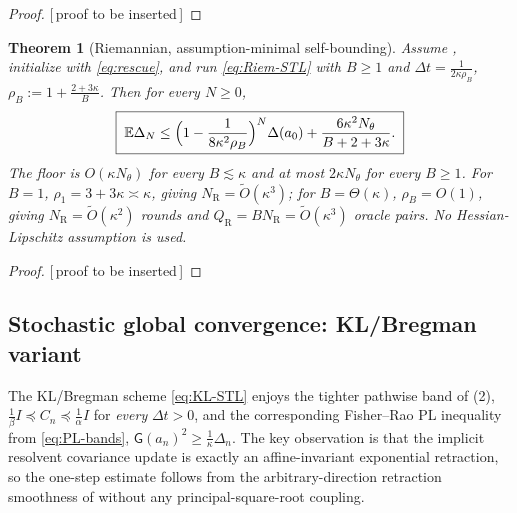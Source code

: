 \documentclass[11pt]{article}
\theoremstyle{plain}
\newtheorem{theorem}{Theorem}[section]
\theoremstyle{definition}
\theoremstyle{remark}
\newcommand{\E}{\mathbb{E}}
\newcommand{\Id}{I}
\newcommand{\Riem}{\mathrm{R}}
\newcommand{\Gradnorm}{\mathsf{G}}
\newcommand{\PROOFHOLE}{{\color{red}\textsf{[\,proof to be inserted\,]}}}
\begin{document}
\begin{proof}
\PROOFHOLE
\end{proof}

\begin{theorem}[Riemannian, assumption-minimal self-bounding]
\label{thm:Riem-selfbound}
Assume , initialize with \eqref{eq:rescue}, and run \eqref{eq:Riem-STL}
with $B\geq1$ and $\Delta t=\tfrac1{2\kappa\rho_B}$, $\rho_B:=1+\tfrac{2+3\kappa}B$. Then for every
$N\geq0$,
\begin{equation}
\label{eq:Riem-selfbound}
    \boxed{\;
    \E\Delta_N\leq\Bigl(1-\frac1{8\kappa^2\rho_B}\Bigr)^N\Delta(a_0)+\frac{6\kappa^2N_\theta}{B+2+3\kappa} .
    \;}
\end{equation}
The floor is $O(\kappa N_\theta)$ for every $B\lesssim\kappa$ and at most $2\kappa N_\theta$ for every
$B\geq1$. For $B=1$, $\rho_1=3+3\kappa\asymp\kappa$, giving $N_{\Riem}=\widetilde O(\kappa^3)$; for
$B=\Theta(\kappa)$, $\rho_B=O(1)$, giving $N_{\Riem}=\widetilde O(\kappa^2)$ rounds and
$Q_{\Riem}=BN_{\Riem}=\widetilde O(\kappa^3)$ oracle pairs. No Hessian-Lipschitz assumption is used.
\end{theorem}

\begin{proof}
\PROOFHOLE
\end{proof}
\subsection{Stochastic global convergence: KL/Bregman variant}
\label{sec:stoch-KL}

The KL/Bregman scheme \eqref{eq:KL-STL} enjoys the tighter pathwise band of
(2), $\tfrac1\beta\Id\preceq C_n\preceq\tfrac1\alpha\Id$ for \emph{every}
$\Delta t>0$, and the corresponding Fisher--Rao PL inequality from \eqref{eq:PL-bands},
$\Gradnorm(a_n)^2\geq\tfrac1\kappa\Delta_n$. The key observation is that the implicit resolvent
covariance update is exactly an affine-invariant exponential retraction, so the one-step estimate
follows from the arbitrary-direction retraction smoothness of  without any
principal-square-root coupling.
\end{document}
